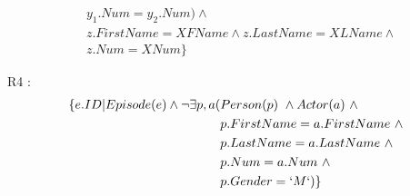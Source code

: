 \documentclass[a4paper,12pt]{article}
\begin{document}
\begin{list}{-}{}
\begin{align*}
      &y_1.Num = y_2.Num) \wedge \\
      &z.FirstName = XFName \wedge z.LastName = XLName \wedge \\
      &z.Num = XNum\}
    \end{align*}
  \item R4 :
    \begin{align*}
      \{ e.ID | Episode(e) \wedge \lnot \exists p, a (&Person(p) ~\wedge Actor(a) ~\wedge \\
        & p.FirstName = a.FirstName ~\wedge \\
        & p.LastName = a.LastName ~\wedge \\
        & p.Num = a.Num ~\wedge \\
        & p.Gender = `M`)\}
    \end{align*}
\end{list}
          
\end{document}
